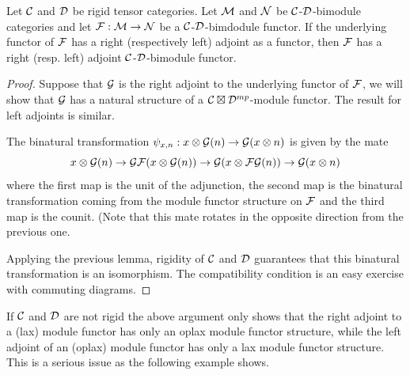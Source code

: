 \documentclass{amsart}
\begin{document}
\begin{lemma} \label{module-adjoint}
Let $\mathcal C$ and $\mathcal D$ be rigid tensor categories. Let  $\mathcal M$ and  $\mathcal N$  be  $\mathcal C$-$\mathcal D$-bimodule categories and let $\mathcal F: \mathcal M \to \mathcal N$ be a $\mathcal C$-$\mathcal D$-bimdodule functor.  If the underlying functor of $\mathcal F$ has a right (respectively left) adjoint as a functor, then $\mathcal F$ has a right (resp. left) adjoint $\mathcal C$-$\mathcal D$-bimodule functor. 
\end{lemma}
\begin{proof}
Suppose that $\mathcal G$ is the right adjoint to the underlying functor of $\mathcal F$, we will show that $\mathcal G$ has a natural structure of a $\mathcal C\boxtimes \mathcal D^{mp}$-module functor.  The result for left adjoints is similar.

The binatural transformation $\psi_{x,n}: x \otimes \mathcal G(n) \rightarrow \mathcal G(x \otimes n)$ is given by the mate
$$x \otimes \mathcal G(n) \rightarrow \mathcal G \mathcal F(x \otimes \mathcal G(n)) \rightarrow \mathcal G(x \otimes \mathcal F\mathcal G(n)) \rightarrow \mathcal G(x \otimes n)$$
where the first map is the unit of the adjunction, the second map is the binatural transformation coming from the module functor structure on $\mathcal F$ and the third map is the counit.  (Note that this mate rotates in the opposite direction from the previous one.


Applying the previous lemma, rigidity of $\mathcal C$ and $\mathcal D$ guarantees that this binatural transformation is an isomorphism.  The compatibility condition is an easy exercise with commuting diagrams.
\end{proof}

\begin{remark}
If $\mathcal C$ and $\mathcal D$ are not rigid the above argument only shows that the right adjoint to a (lax) module functor has only an oplax module functor structure, while the left adjoint of an (oplax) module functor has only a lax module functor structure.  This is a serious issue as the following example shows. 
\end{remark}
\end{document}

